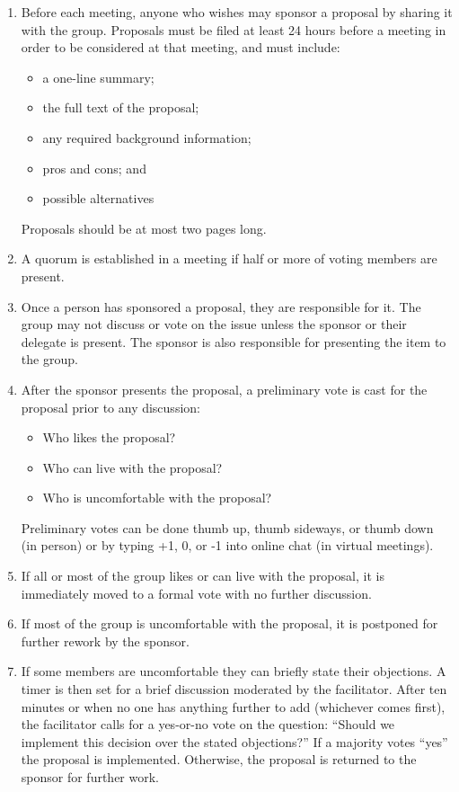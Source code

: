 \begin{descripción}
\begin{enumerate}

\item
  Before each meeting,
  anyone who wishes may sponsor a proposal by sharing it with the group.
  Proposals must be filed at least 24 hours before a meeting in order to be considered at that meeting,
  and must include:
  \begin{itemize}
  \item a one-line summary;
  \item the full text of the proposal;
  \item any required background information;
  \item pros and cons; and
  \item possible alternatives
  \end{itemize}
  Proposals should be at most two pages long.

\item
  A quorum is established in a meeting if half or more of voting members are present.

\item
  Once a person has sponsored a proposal,
  they are responsible for it.
  The group may not discuss or vote on the issue unless the sponsor or their delegate is present.
  The sponsor is also responsible for presenting the item to the group.

\item
  After the sponsor presents the proposal,
  a preliminary vote is cast for the proposal prior to any discussion:
  \begin{itemize}
  \item Who likes the proposal?
  \item Who can live with the proposal?
  \item Who is uncomfortable with the proposal?
  \end{itemize}
  Preliminary votes can be done thumb up, thumb sideways, or thumb down (in person)
  or by typing +1, 0, or -1 into online chat (in virtual meetings).

\item
  If all or most of the group likes or can live with the proposal,
  it is immediately moved to a formal vote with no further discussion.

\item
  If most of the group is uncomfortable with the proposal,
  it is postponed for further rework by the sponsor.

\item
  If some members are uncomfortable they can briefly state their objections.
  A timer is then set for a brief discussion moderated by the facilitator.
  After ten minutes or when no one has anything further to add (whichever comes first),
  the facilitator calls for a yes-or-no vote on the question:
  ``Should we implement this decision over the stated objections?''
  If a majority votes ``yes'' the proposal is implemented.
  Otherwise, the proposal is returned to the sponsor for further work.


\end{enumerate}
\end{descripción}
